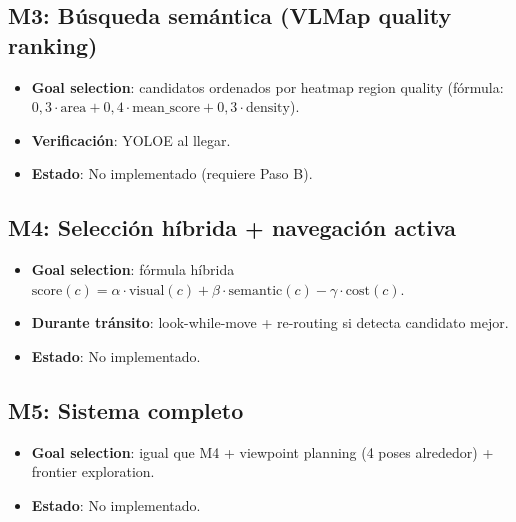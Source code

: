 \documentclass[11pt,a4paper]{article}
\begin{document}
\subsection{M3: Búsqueda semántica (VLMap quality ranking)}

\begin{itemize}
  \item \textbf{Goal selection}: candidatos ordenados por heatmap region quality
        (fórmula: $0{,}3 \cdot \text{area} + 0{,}4 \cdot \text{mean\_score} + 0{,}3 \cdot
        \text{density}$).
  \item \textbf{Verificación}: YOLOE al llegar.
  \item \textbf{Estado}: \textcolor{pendingcol}{No implementado} (requiere Paso B).
\end{itemize}

\subsection{M4: Selección híbrida + navegación activa}

\begin{itemize}
  \item \textbf{Goal selection}: fórmula híbrida
        $\text{score}(c) = \alpha \cdot \text{visual}(c) + \beta \cdot \text{semantic}(c)
        - \gamma \cdot \text{cost}(c)$.
  \item \textbf{Durante tránsito}: look-while-move + re-routing si detecta candidato mejor.
  \item \textbf{Estado}: \textcolor{pendingcol}{No implementado}.
\end{itemize}

\subsection{M5: Sistema completo}

\begin{itemize}
  \item \textbf{Goal selection}: igual que M4 + viewpoint planning (4 poses alrededor)
        + frontier exploration.
  \item \textbf{Estado}: \textcolor{pendingcol}{No implementado}.
\end{itemize}
\end{document}
